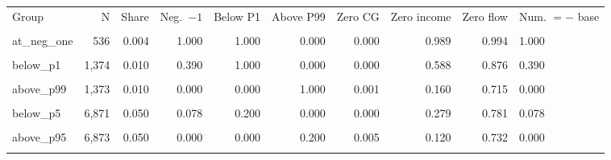 \begin{tabular*}{\linewidth}{@{\extracolsep{\fill}}lrrrrrrrr}\toprule
Group & N & Share & Neg.\ $-1$ & Below P1 & Above P99 & Zero CG & Zero income & Zero flow & Num. $=-$ base \\\\
\midrule
at\_neg\_one & 536 & 0.004 & 1.000 & 1.000 & 0.000 & 0.000 & 0.989 & 0.994 & 1.000 \\\\
below\_p1 & 1,374 & 0.010 & 0.390 & 1.000 & 0.000 & 0.000 & 0.588 & 0.876 & 0.390 \\\\
above\_p99 & 1,373 & 0.010 & 0.000 & 0.000 & 1.000 & 0.001 & 0.160 & 0.715 & 0.000 \\\\
below\_p5 & 6,871 & 0.050 & 0.078 & 0.200 & 0.000 & 0.000 & 0.279 & 0.781 & 0.078 \\\\
above\_p95 & 6,873 & 0.050 & 0.000 & 0.000 & 0.200 & 0.005 & 0.120 & 0.732 & 0.000 \\\\
\bottomrule
\end{tabular*}
